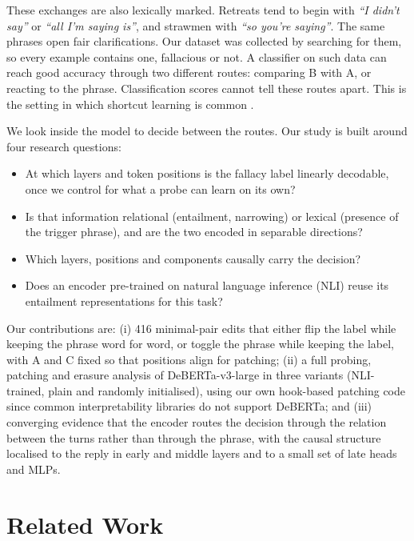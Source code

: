 \documentclass[11pt]{article}
\begin{document}
These exchanges are also lexically marked. Retreats tend to begin with \textit{``I didn't say''} or \textit{``all I'm saying is''}, and strawmen with \textit{``so you're saying''}. The same phrases open fair clarifications. Our dataset was collected by searching for them, so every example contains one, fallacious or not. A classifier on such data can reach good accuracy through two different routes: comparing B with A, or reacting to the phrase. Classification scores cannot tell these routes apart. This is the setting in which shortcut learning is common \citep{gururangan2018annotation,mccoy2019right,geirhos2020shortcut}.

We look inside the model to decide between the routes. Our study is built around four research questions:
\begin{itemize}\setlength\itemsep{0pt}
\item[\textbf{RQ1}] At which layers and token positions is the fallacy label linearly decodable, once we control for what a probe can learn on its own?
\item[\textbf{RQ2}] Is that information relational (entailment, narrowing) or lexical (presence of the trigger phrase), and are the two encoded in separable directions?
\item[\textbf{RQ3}] Which layers, positions and components causally carry the decision?
\item[\textbf{RQ4}] Does an encoder pre-trained on natural language inference (NLI) reuse its entailment representations for this task?
\end{itemize}

Our contributions are: (i) 416 minimal-pair edits that either flip the label while keeping the phrase word for word, or toggle the phrase while keeping the label, with A and C fixed so that positions align for patching; (ii) a full probing, patching and erasure analysis of DeBERTa-v3-large in three variants (NLI-trained, plain and randomly initialised), using our own hook-based patching code since common interpretability libraries do not support DeBERTa; and (iii) converging evidence that the encoder routes the decision through the relation between the turns rather than through the phrase, with the causal structure localised to the reply in early and middle layers and to a small set of late heads and MLPs.

\section{Related Work}
\end{document}
